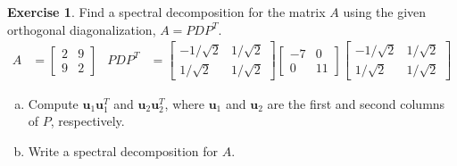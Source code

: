 \documentclass[10pt]{book}
\theoremstyle{definition}
\newtheorem{exercise}{Exercise}[section]
\newcommand{\name}[1][2.5in]{\vspace{-2.3em}\hfill Name: \underline{\hspace{#1}}}
\newcommand{\vect}[1]{\ensuremath{\boldsymbol{\mathbf{#1}}}}
\begin{document}
\begin{exercise} %
	Find a spectral decomposition for the matrix $A$ using the given orthogonal diagonalization, $A=PDP^T$.
	\begin{align*}
	A &= \begin{bmatrix}2&9\\9&2\end{bmatrix} &
	PDP^T &= 
	\begin{bmatrix}-1/\sqrt{2}&1/\sqrt{2}\\1/\sqrt{2}&1/\sqrt{2}\end{bmatrix}
	\begin{bmatrix}-7&0\\0&11\end{bmatrix}
	\begin{bmatrix}-1/\sqrt{2}&1/\sqrt{2}\\1/\sqrt{2}&1/\sqrt{2}\end{bmatrix}
	\end{align*}
	\begin{enumerate}[(a)]
		\item Compute $\vect{u}_1\vect{u}_1^T$ and $\vect{u}_2\vect{u}_2^T$, where $\vect{u}_1$ and $\vect{u}_2$ are the first and second columns of $P$, respectively.
		\vspace{1in}
		\item Write a spectral decomposition for $A$.
		\vspace{3em}
	\end{enumerate}
\end{exercise}


%
%
%
%
%
%
%
%
%
%
%
%
%
%
%
%
%
%
%
%
%
%
%
%
\end{document}
